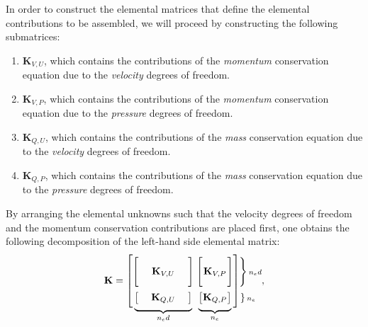 In order to construct the elemental matrices that define the elemental contributions to be assembled, we will proceed by constructing the following submatrices:
\begin{enumerate}
  \item $\mathbf{K}_{V, U}$, which contains the contributions of the \emph{momentum} conservation equation due to the \emph{velocity} degrees of freedom.
  \item $\mathbf{K}_{V, P}$, which contains the contributions of the \emph{momentum} conservation equation due to the \emph{pressure} degrees of freedom.
  \item $\mathbf{K}_{Q, U}$, which contains the contributions of the \emph{mass} conservation equation due to the \emph{velocity} degrees of freedom.
  \item $\mathbf{K}_{Q, P}$, which contains the contributions of the \emph{mass} conservation equation due to the \emph{pressure} degrees of freedom.
\end{enumerate}
By arranging the elemental unknowns such that the velocity degrees of freedom and the momentum conservation contributions are placed first, one obtains the following decomposition of the left-hand side elemental matrix:
\begin{equation}
  \mathbf{K} =
  \begingroup %
  \setlength\arraycolsep{1.5pt}
  \begin{bmatrix}
    \mystrut(20,10)\begin{bmatrix} \makebox[5em]{$\Bigg.\mathbf{K}_{V, U}$} \end{bmatrix} &
    \begin{bmatrix} \makebox[2.5em]{$\Bigg.\mathbf{K}_{V, P}$} \end{bmatrix}
    \\[3ex] \mystrut(10,7)
    \smash{
      \underbrace{\mystrut(10,7)
    \begin{bmatrix} \makebox[5em]{$\mathbf{K}_{Q, U}$} \end{bmatrix}}_{n_e d}}            &
    \smash{
      \underbrace{\mystrut(10,7)
        \begin{bmatrix} \makebox[2.5em]{$\mathbf{K}_{Q, P}$} \end{bmatrix}}_{n_e}}
  \end{bmatrix}\!\!
  \begin{matrix*}\mystrut(20,10)
    \left. \vphantom{
      \begin{matrix*} \makebox[2.5em]{$\Bigg.\mathbf{K}_{V, P}$} \end{matrix*}
    } \right \rbrace{\scriptstyle n_e d}
    \\[3ex] \mystrut(10,7)
    \left. \!\!\!\vphantom{
      \smash{
        \underbrace{\mystrut(10,7)
          \begin{matrix*} \makebox[2.5em]{$\mathbf{K}_{Q, P}$} \end{matrix*}}_{n_e}}
    } \right \rbrace{\scriptstyle n_e}
  \end{matrix*}
  \mystrut(0,35)
  \endgroup,
\end{equation}
